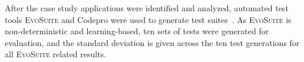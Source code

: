 \begin{table}[!t]
\caption{Benchmark Programs and their Properties}
\label{tbl:program_table}
\end{table}

After the case study applications were identified and analyzed, automated test tools \textsc{EvoSuite} and Codepro were used to generate test suites~\cite{CodePro1, fraser:2011:eat:2025113.2025179}. As \textsc{EvoSuite} is non-deterministic and learning-based, ten sets of tests were generated for evaluation, and the standard deviation is given across the ten test generations for all \textsc{EvoSuite} related results.  

